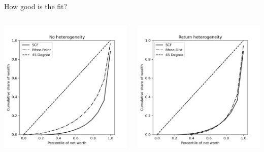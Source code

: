 \documentclass{beamer}
\begin{document}
\begin{frame}{How good is the fit?}
 \begin{columns}
    \centering
    \includegraphics[width=\textwidth]{Figures/LCrrPointNetWorthPlot.png}

    \centering
    \includegraphics[width=\textwidth]{Figures/LCrrDistNetWorthPlot.png}

  \end{columns}
\end{frame}
\end{document}
